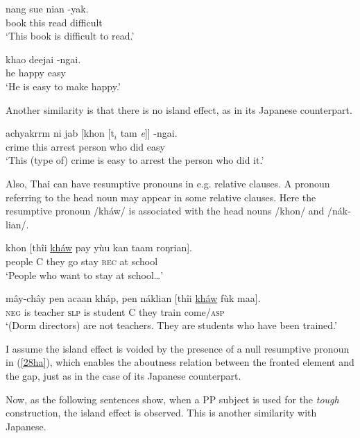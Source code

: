 \documentclass[output=paper]{langscibook}
\begin{document}
\begin{exe}
\ex \label{26ha}
\gll nang  sue  nian -yak.\\
book this read difficult\\
\glt ‘This book is difficult to read.’

\ex \label{27ha}
\gll khao deejai -ngai.\\
he happy easy\\
\glt ‘He is easy to make happy.’
\end{exe}

Another similarity is that there is no island effect, as in its Japanese counterpart.

\begin{exe}
\ex \label{28ha}
\gll achyakrrm ni  jab [khon  [t$_{i}$   tam  \textit{e}]]  -ngai.\\
crime this arrest person who did {} easy\\
\glt ‘This (type of) crime is easy to arrest the person who did it.’
\end{exe}

Also, Thai can have resumptive pronouns in e.g. relative clauses. A pronoun referring to the head noun may appear in some relative clauses. Here the resumptive pronoun /kháw/ is associated with the head nouns /khon/ and /nák-lian/.  

\begin{exe}
\ex \label{29ha}
\gll khon  [thîi \underline{kháw} pay yùu  kan taam roŋrian]. \\
people C they go stay \textsc{rec} at school\\
\glt ‘People who want to stay at school…’ \citep{IwasakiIngkaphirom2005}


\ex \label{30ha}
\gll mây-chây pen acaan kháp, pen náklian [thîi \underline{kháw} fùk maa].\\
\textsc{neg} is teacher \textsc{slp} is student C they train come/\textsc{asp}\\
\glt ‘(Dorm directors) are not teachers. They are students who have been trained.’
\end{exe}

I assume the island effect is voided by the presence of a null resumptive pronoun in (\ref{28ha}), which enables the aboutness relation between the fronted element and the gap, just as in the case of its Japanese counterpart. 

Now, as the following sentences show, when a PP subject is used for the \textit{tough} construction, the island effect is observed. This is another similarity with Japanese.
\end{document}
